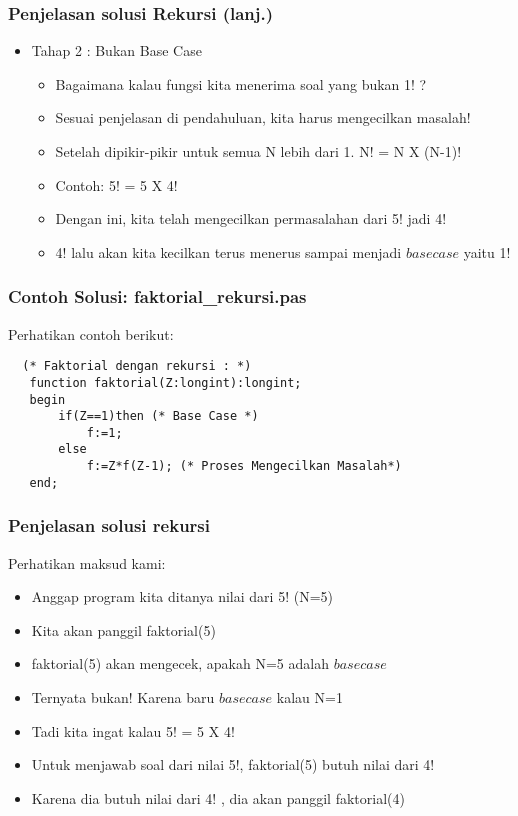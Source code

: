 \documentclass{beamer}
\begin{document}
\begin{frame}
\frametitle{Penjelasan solusi Rekursi (lanj.) }
\begin{itemize}
    \item Tahap 2 : Bukan Base Case
    \begin {itemize}
        \item Bagaimana kalau fungsi kita menerima soal yang bukan 1! ?
        \item Sesuai penjelasan di pendahuluan, kita harus mengecilkan masalah!
        \item Setelah dipikir-pikir untuk semua N lebih dari 1. N! = N X (N-1)! 
        \item Contoh: 5! = 5 X 4!
        \item Dengan ini, kita telah mengecilkan permasalahan dari 5! jadi 4!
        \item 4! lalu akan kita kecilkan terus menerus sampai menjadi $base case$ yaitu 1!
    \end {itemize}
\end{itemize}
\end{frame} 

\begin{frame}[fragile]
\frametitle{Contoh Solusi: faktorial\_rekursi.pas}
Perhatikan contoh berikut:
\begin{lstlisting}
  (* Faktorial dengan rekursi : *)
   function faktorial(Z:longint):longint;
   begin
       if(Z==1)then (* Base Case *)
           f:=1;
       else
           f:=Z*f(Z-1); (* Proses Mengecilkan Masalah*)
   end;      
\end{lstlisting}
\end{frame}
 
\begin{frame}
\frametitle{Penjelasan solusi rekursi}
Perhatikan maksud kami:
\begin {itemize}
    \item Anggap program kita ditanya nilai dari 5! (N=5)
    \item Kita akan panggil faktorial(5) 
    \item faktorial(5) akan mengecek, apakah N=5 adalah $base case$
    \item Ternyata bukan! Karena baru $base case$ kalau N=1
    \item Tadi kita ingat kalau 5! = 5 X 4!
    \item Untuk menjawab soal dari nilai 5!, faktorial(5)  butuh nilai dari 4!
    \item Karena dia butuh nilai dari 4! , dia akan panggil faktorial(4) 
\end{itemize}
\end{frame}
\end{document}
